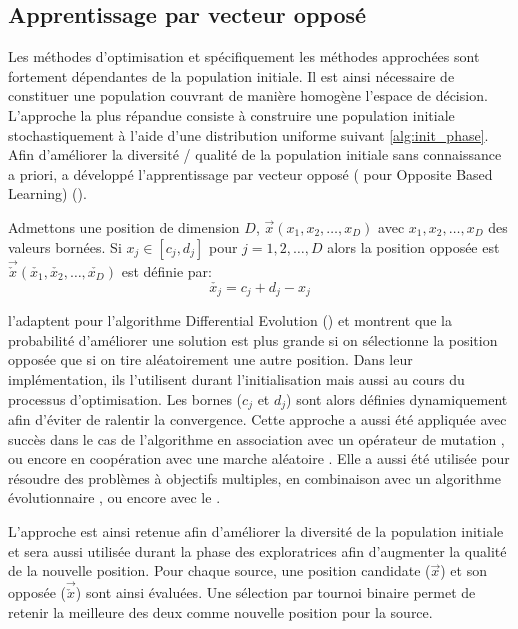 \subsection{Apprentissage par vecteur opposé} %
\label{sub:apprentissage_par_vecteur_oppose}
Les méthodes d’optimisation et spécifiquement les méthodes approchées sont fortement
dépendantes de la population initiale. Il est ainsi nécessaire
de constituer une population couvrant de manière homogène l’espace de décision.
L’approche la plus répandue consiste à construire une population initiale stochastiquement
à l’aide d’une distribution uniforme suivant \eqref{alg:init_phase}.
Afin d’améliorer la diversité / qualité de la population initiale sans connaissance
a priori, \textcite{Tizhoosh2005695} a développé l’apprentissage par vecteur opposé
( pour Opposite Based Learning) ().

\begin{Def}\label{def:oblm}
Admettons une position de dimension $D$, $\vec{x}(x_{1}, x_{2}, \dotsc, x_{D})$ avec
$x_{1}, x_{2}, \dotsc, x_{D}$ des valeurs bornées. Si $x_{j} \in [c_{j}, d_{j}]$ pour
$j = 1, 2, \dotsc, D$ alors la position opposée est $\vec{\check{x}}(\check{x_{1}},%
\check{x_{2}}, \dotsc, \check{x_{D}})$ est définie par:
\[\check{x_{j}} = c_{j} + d_{j} - x_{j}\]
\end{Def}

\textcite{Rahnamayan2008906} l’adaptent pour l’algorithme Differential Evolution ()
et montrent que la probabilité d’améliorer une solution est plus grande si on sélectionne
la position opposée que si on tire aléatoirement une autre position.
Dans leur implémentation, ils l’utilisent durant l’initialisation mais aussi au cours du
processus d’optimisation. Les bornes ($c_{j}$ et $d_{j}$) sont alors définies dynamiquement
afin d’éviter de ralentir la convergence.
Cette approche a aussi été appliquée avec succès dans le cas de l’algorithme 
en association avec un opérateur de mutation \parencite{Bi2011174}, ou encore en coopération
avec une marche aléatoire \parencite{Sharma2012213}. Elle a aussi été utilisée pour
résoudre des problèmes à objectifs multiples, en combinaison avec un algorithme
évolutionnaire \parencite{Ma201448}, ou encore avec le  \parencite{Gao2013114}.

L’approche est ainsi retenue afin d’améliorer la diversité de la population initiale
et sera aussi utilisée durant la phase des exploratrices afin d’augmenter la qualité
de la nouvelle position.
Pour chaque source, une position candidate ($\vec{x}$) et son opposée
($\vec{\check{x}}$) sont ainsi évaluées. Une sélection par tournoi binaire permet
de retenir la meilleure des deux comme nouvelle position pour la source.


